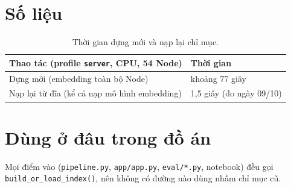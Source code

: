 \section{Số liệu}

\begin{table}[H]
  \centering
  \small
  \begin{tabularx}{\textwidth}{X l}
    \toprule
    \textbf{Thao tác (profile \texttt{server}, CPU, 54 Node)} & \textbf{Thời gian} \\
    \midrule
    Dựng mới (embedding toàn bộ Node) & khoảng 77 giây \\
    Nạp lại từ đĩa (kể cả nạp mô hình embedding) & 1,5 giây (đo ngày 09/10) \\
    \bottomrule
  \end{tabularx}
  \caption{Thời gian dựng mới và nạp lại chỉ mục.}
\end{table}

\section{Dùng ở đâu trong đồ án}

Mọi điểm vào (\texttt{pipeline.py}, \texttt{app/app.py}, \texttt{eval/*.py}, notebook) đều gọi
\texttt{build\_or\_load\_index()}, nên không có đường nào dùng nhầm chỉ mục cũ.
